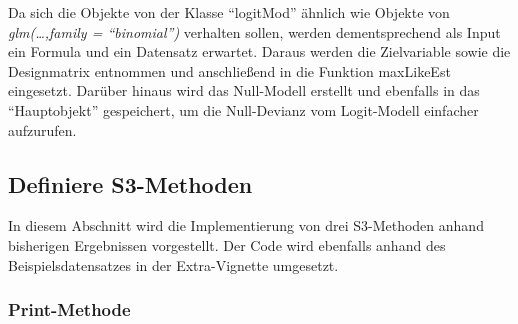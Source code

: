 \documentclass[12pt,]{article}
\begin{document}
Da sich die Objekte von der Klasse ``logitMod'' ähnlich wie Objekte von
\emph{glm(\ldots{},family = ``binomial'')} verhalten sollen, werden
dementsprechend als Input ein Formula und ein Datensatz erwartet. Daraus
werden die Zielvariable sowie die Designmatrix entnommen und
anschließend in die Funktion maxLikeEst eingesetzt. Darüber hinaus wird
das Null-Modell erstellt und ebenfalls in das ``Hauptobjekt''
gespeichert, um die Null-Devianz vom Logit-Modell einfacher aufzurufen.

\subsection{Definiere S3-Methoden}\label{definiere-s3-methoden}

In diesem Abschnitt wird die Implementierung von drei S3-Methoden anhand
bisherigen Ergebnissen vorgestellt. Der Code wird ebenfalls anhand des
Beispielsdatensatzes in der Extra-Vignette umgesetzt.

\subsubsection{Print-Methode}\label{print-methode}
\end{document}
